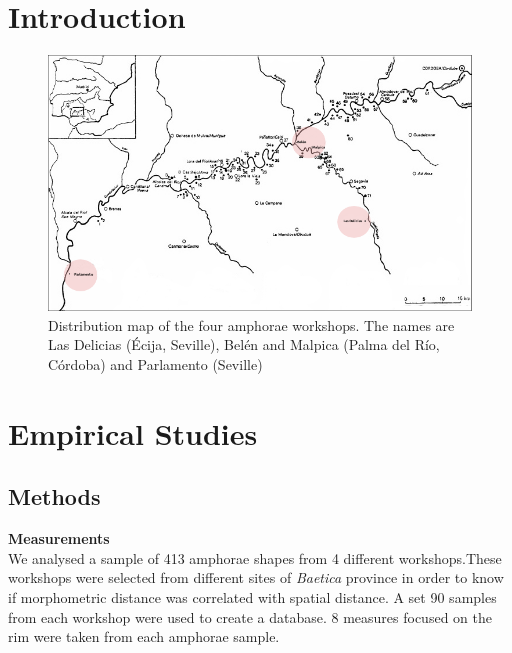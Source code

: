\documentclass[a4paper]{article}
\title{}
\author{}
\date{}
\begin{document}
\section{Introduction}
\begin{figure}[h!]
    \centering
    \includegraphics[width=0.6\linewidth]{images/fig1.png}
    \caption{Distribution map of the four amphorae workshops. The names are Las Delicias (\'Ecija, Seville), Bel\'en and Malpica (Palma del R\'io, C\'ordoba) and Parlamento (Seville)}

\end{figure}

\section{Empirical Studies}
\subsection{Methods}

{\textbf{Measurements}} \\

We analysed a sample of 413 amphorae shapes from 4 different workshops.These workshops were selected from different sites of \emph{Baetica} province in order to know if morphometric distance was correlated with spatial distance. A set 90 samples from each workshop were used to create a database. 8 measures focused on the rim were taken from each amphorae sample. 
\end{document}
